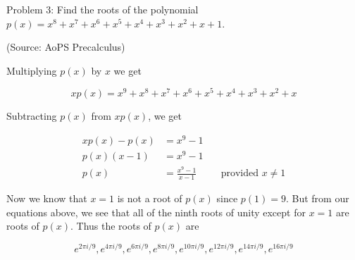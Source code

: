 Problem 3: Find the roots of the polynomial $p(x) = x^8 + x^7 + x^6 + x^5 + x^4 + x^3 + x^2 + x + 1$.

(Source: AoPS Precalculus)

Multiplying $p(x)$ by $x$ we get

$$ xp(x) = x^9 + x^8 + x^7 + x^6 + x^5 + x^4 + x^3 + x^2 + x $$

Subtracting $p(x)$ from $xp(x)$, we get

\begin{align*}
xp(x) - p(x) &= x^9 - 1 \\
p(x)(x - 1) &= x^9 - 1 \\
p(x) &= \frac{x^9 - 1}{x - 1} &\quad \text{provided $x \neq 1$}
\end{align*}

Now we know that $x = 1$ is not a root of $p(x)$ since $p(1) = 9$. But from our equations above, we see that all of the ninth roots of unity except for $x = 1$ are roots of $p(x)$. Thus the roots of $p(x)$ are

$$ \boxed{e^{2\pi i / 9}, e^{4\pi i / 9}, e^{6\pi i / 9}, e^{8\pi i / 9}, e^{10\pi i / 9}, e^{12\pi i / 9}, e^{14\pi i / 9}, e^{16\pi i / 9}} $$
